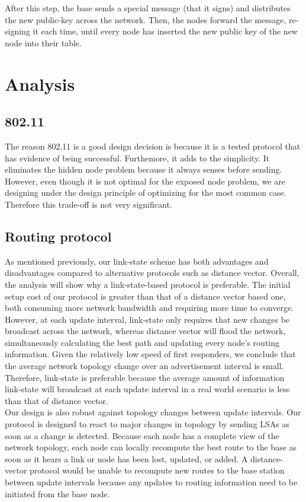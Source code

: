 \documentclass[letterpaper]{article}
\begin{document}
\noindent After this step, the base sends a special message (that it signs) and distributes the new public-key across the network. 
Then, the nodes forward the message, re-signing it each time, until every node has inserted the new public key of the new node into their table.

\section{Analysis}

\subsection{802.11}
The reason 802.11 is a good design decision is because it is a tested protocol that has evidence of being successful. Furthemore, it adds to the simplicity. It eliminates the hidden node problem because it always senses before sending. However, even though it is not optimal for the exposed node problem, we are designing under the design principle of optimizing for the most common case. Therefore this trade-off is not very significant.

\subsection{Routing protocol}

As mentioned previously, our link-state scheme has both advantages and disadvantages compared to alternative protocols
such as distance vector. Overall, the analysis will show why a link-state-based protocol is preferable. The initial
setup cost of our protocol is greater than that of a distance vector based one, both consuming more network bandwidth
and requiring more time to converge. However, at each update interval, link-state only requires that new changes
be broadcast across the network, whereas distance vector will flood the network, simultaneously calculating the 
best path and updating every node's routing information. Given the relatively low speed of first responders, we 
conclude that the average network topology change over an advertisement interval is small. Therefore, link-state is
preferable because the average amount of information link-state will broadcast at each update interval in a real world
scenario is less than that of distance vector.
\\

\noindent Our design is also robust against topology changes between update intervals. Our protocol is designed to react
to major changes in topology by sending LSAs as soon as a change is detected. Because each node has a complete view of 
the network topology, each node can locally recompute the best route to the base as soon as it hears a link or node has 
been lost, updated, or added. A distance-vector protocol would be unable to recompute new routes to the base station
between update intervals because any updates to routing information need to be initiated from the base node.
\\
\end{document}

